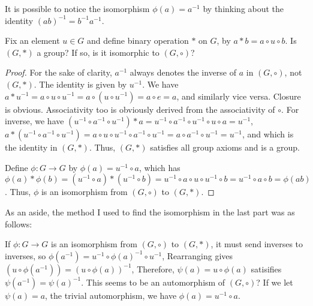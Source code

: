 \documentclass[11pt]{article}
\begin{document}
It is possible to notice the isomorphism $\phi(a) = a^{-1}$
by thinking about the identity $(ab)^{-1} = b^{-1}a^{-1}$.

\begin{subquestion}
    Fix an element $u \in G$ and define binary operation $*$ on $G$,
    by $a * b = a \circ u \circ b$. Is $(G,*)$ a group? If so, is it isomorphic to $(G,\circ)$?
\end{subquestion}

\begin{proof}
    For the sake of clarity, $a^{-1}$ always denotes the inverse of $a$ in $(G,\circ)$, not $(G,*)$.
    The identity is given by $u^{-1}$.
    We have $a * u^{-1} = a \circ u \circ u^{-1} = a \circ (u \circ u^{-1}) = a \circ e = a$,
    and similarly vice versa. Closure is obvious.
    Associativity too is obviously derived from the associativity of $\circ$.
    For inverse, we have
    $(u^{-1} \circ a^{-1} \circ u^{-1}) * a = u^{-1} \circ a^{-1} \circ u^{-1} \circ u \circ a = u^{-1}$,
    $a * (u^{-1} \circ a^{-1} \circ u^{-1}) = a \circ u \circ u^{-1} \circ a^{-1} \circ u^{-1} = a \circ a^{-1} \circ u^{-1} = u^{-1}$, and
    which is the identity in $(G,*)$. Thus, $(G,*)$ satisfies all group axioms and is a group.

    Define $\phi : G \to G$ by $\phi(a) = u^{-1} \circ a$, which has
    $\phi(a)*\phi(b) = (u^{-1}\circ a) * (u^{-1} \circ b)
    = u^{-1} \circ a \circ u \circ u^{-1} \circ b = u^{-1} \circ a \circ b = \phi(ab) $.
    Thus, $\phi$ is an isomorphism from $(G,\circ)$ to $(G,*)$.
\end{proof}

As an aside, the method I used to find the isomorphism in the last part 
was as follows:

If $\phi : G \to G$ is an isomorphism from $(G,\circ)$ to $(G,*)$, 
it must send inverses to inverses, so $\phi(a^{-1}) = u^{-1} \circ \phi(a)^{-1} \circ u^{-1}$,
Rearranging gives $(u \circ \phi(a^{-1})) = (u \circ \phi(a))^{-1}$,
Therefore, $\psi(a) = u \circ \phi(a)$ satisifies $\psi(a^{-1}) = \psi(a)^{-1}$.
This seems to be an automorphism of $(G,\circ)$?
If we let $\psi(a) = a$, the trivial automorphism,
we have $\phi(a) = u^{-1} \circ a$.
\end{document}
